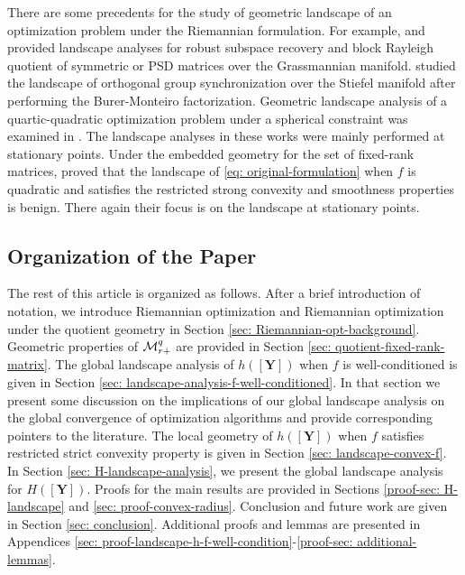 \documentclass[11pt]{article}
\newcommand{\0}{{\mathbf{0}}}
\newcommand{\1}{{\mathbf{1}}}
\newcommand{\Y}{{\mathbf{Y}}}
\newcommand{\cM}{{\cal M}}
\newcommand{\nc}{\normalcolor}
\begin{document}
There are some precedents for the study of geometric landscape of an optimization problem under the Riemannian formulation. For example, \cite{maunu2019well} and \cite{alimisis2022geodesic} provided landscape analyses for robust subspace recovery and block Rayleigh quotient of symmetric or PSD matrices over the Grassmannian manifold. \cite{ling2020solving} studied the landscape of orthogonal group synchronization over the Stiefel manifold after performing the Burer-Monteiro factorization. Geometric landscape analysis of a quartic-quadratic optimization problem under a spherical constraint was examined in \cite{zhang2021geometric}. The landscape analyses in these works were mainly performed at stationary points. Under the embedded geometry for the set of fixed-rank matrices, \cite{uschmajew2018critical} proved that the landscape of \eqref{eq: original-formulation} when $f$ is quadratic and satisfies the restricted strong convexity and smoothness properties is benign. There again their focus is on the landscape at stationary points. 

\subsection{Organization of the Paper}\label{sec: organization}
The rest of this article is organized as follows. After a brief introduction of notation, we introduce Riemannian optimization and Riemannian optimization under the quotient geometry in Section \ref{sec: Riemannian-opt-background}. Geometric properties of $\cM_{r+}^q$ are provided in Section \ref{sec: quotient-fixed-rank-matrix}. The global landscape analysis of $h([\Y])$ when $f$ is well-conditioned is given in Section \ref{sec: landscape-analysis-f-well-conditioned}. In that section we present some discussion on the implications of our global landscape analysis on the global convergence of optimization algorithms and provide corresponding pointers to the literature. \nc The local geometry of $h([\Y])$ when $f$ satisfies restricted strict convexity property is given in Section \ref{sec: landscape-convex-f}. In Section \ref{sec: H-landscape-analysis}, we present the global landscape analysis for $H([\Y])$. Proofs for the main results are provided in Sections \ref{proof-sec: H-landscape} and \ref{sec: proof-convex-radius}. Conclusion and future work are given in Section \ref{sec: conclusion}. Additional proofs and lemmas are presented in Appendices \ref{sec: proof-landscape-h-f-well-condition}-\ref{proof-sec: additional-lemmas}.
\end{document}
